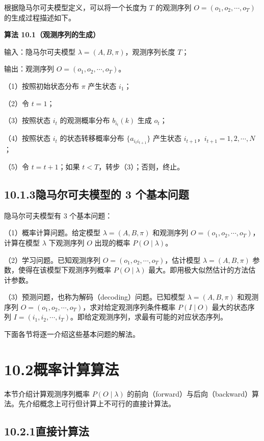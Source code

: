 \documentclass[UTF8,12pt,a4paper,fontset=fandol]{ctexart}
\begin{document}
根据隐马尔可夫模型定义，可以将一个长度为 $T$ 的观测序列 $O=(o_1,o_2,\cdots,o_T)$ 的生成过程描述如下。

\noindent\textbf{算法 10.1（观测序列的生成）}\quad

输入：隐马尔可夫模型 $\lambda=(A,B,\pi)$，观测序列长度 $T$；

输出：观测序列 $O=(o_1,o_2,\cdots,o_T)$。

（1）按照初始状态分布 $\pi$ 产生状态 $i_1$；

（2）令 $t=1$；

（3）按照状态 $i_t$ 的观测概率分布 $b_{i_t}(k)$ 生成 $o_t$；

（4）按照状态 $i_t$ 的状态转移概率分布 $\{a_{i_t i_{t+1}}\}$ 产生状态 $i_{t+1}$，$i_{t+1}=1,2,\cdots,N$；

（5）令 $t=t+1$；如果 $t<T$，转步（3）；否则，终止。

\subsection*{10.1.3\quad 隐马尔可夫模型的 3 个基本问题}

隐马尔可夫模型有 $3$ 个基本问题：

（1）概率计算问题。给定模型 $\lambda=(A,B,\pi)$ 和观测序列 $O=(o_1,o_2,\cdots,o_T)$，计算在模型 $\lambda$ 下观测序列 $O$ 出现的概率 $P(O\mid\lambda)$。

（2）学习问题。已知观测序列 $O=(o_1,o_2,\cdots,o_T)$，估计模型 $\lambda=(A,B,\pi)$ 参数，使得在该模型下观测序列概率 $P(O\mid\lambda)$ 最大。即用极大似然估计的方法估计参数。

（3）预测问题，也称为解码（decoding）问题。已知模型 $\lambda=(A,B,\pi)$ 和观测序列 $O=(o_1,o_2,\cdots,o_T)$，求对给定观测序列条件概率 $P(I\mid O)$ 最大的状态序列 $I=(i_1,i_2,\cdots,i_T)$。即给定观测序列，求最有可能的对应状态序列。

下面各节将逐一介绍这些基本问题的解法。

\section*{10.2\quad 概率计算算法}

本节介绍计算观测序列概率 $P(O\mid\lambda)$ 的前向（forward）与后向（backward）算法。先介绍概念上可行但计算上不可行的直接计算法。

\subsection*{10.2.1\quad 直接计算法}
\end{document}
